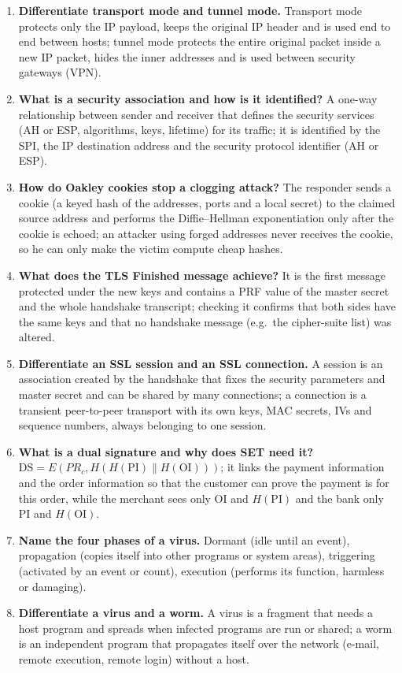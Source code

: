 \begin{enumerate}[leftmargin=1.6em,itemsep=3pt]
  \item \textbf{Differentiate transport mode and tunnel mode.} Transport mode protects only the IP payload, keeps the original IP header and is used end to end between hosts; tunnel mode protects the entire original packet inside a new IP packet, hides the inner addresses and is used between security gateways (VPN).
  \item \textbf{What is a security association and how is it identified?} A one-way relationship between sender and receiver that defines the security services (AH or ESP, algorithms, keys, lifetime) for its traffic; it is identified by the SPI, the IP destination address and the security protocol identifier (AH or ESP).
  \item \textbf{How do Oakley cookies stop a clogging attack?} The responder sends a cookie (a keyed hash of the addresses, ports and a local secret) to the claimed source address and performs the Diffie--Hellman exponentiation only after the cookie is echoed; an attacker using forged addresses never receives the cookie, so he can only make the victim compute cheap hashes.
  \item \textbf{What does the TLS Finished message achieve?} It is the first message protected under the new keys and contains a PRF value of the master secret and the whole handshake transcript; checking it confirms that both sides have the same keys and that no handshake message (e.g.\ the cipher-suite list) was altered.
  \item \textbf{Differentiate an SSL session and an SSL connection.} A session is an association created by the handshake that fixes the security parameters and master secret and can be shared by many connections; a connection is a transient peer-to-peer transport with its own keys, MAC secrets, IVs and sequence numbers, always belonging to one session.
  \item \textbf{What is a dual signature and why does SET need it?} $\mathrm{DS} = E(PR_c, H(H(\mathrm{PI}) \| H(\mathrm{OI})))$; it links the payment information and the order information so that the customer can prove the payment is for this order, while the merchant sees only OI and $H(\mathrm{PI})$ and the bank only PI and $H(\mathrm{OI})$.
  \item \textbf{Name the four phases of a virus.} Dormant (idle until an event), propagation (copies itself into other programs or system areas), triggering (activated by an event or count), execution (performs its function, harmless or damaging).
  \item \textbf{Differentiate a virus and a worm.} A virus is a fragment that needs a host program and spreads when infected programs are run or shared; a worm is an independent program that propagates itself over the network (e-mail, remote execution, remote login) without a host.

\end{enumerate}
